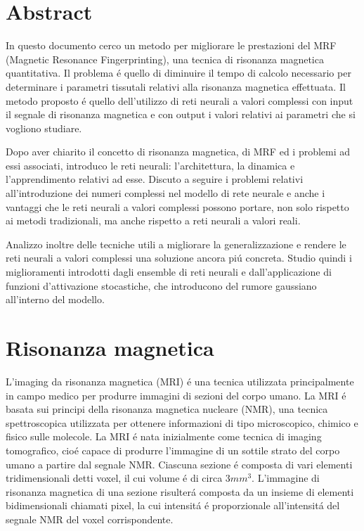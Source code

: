 \documentclass[a4paper,12pt]{report}
\begin{document}
 \chapter*{Abstract}
 
 In questo documento cerco un metodo per migliorare le prestazioni del MRF (Magnetic Resonance Fingerprinting), una tecnica di risonanza magnetica quantitativa. 
 Il problema \'e quello di diminuire il tempo di calcolo necessario per determinare i parametri tissutali relativi alla risonanza magnetica effettuata. 
 Il metodo proposto \'e quello dell'utilizzo di reti neurali a valori complessi con input il segnale di risonanza magnetica e con output i valori relativi ai parametri che si vogliono studiare. 
 
 Dopo aver chiarito il concetto di risonanza magnetica, di MRF ed i problemi ad essi associati, introduco le reti neurali: l'architettura, la dinamica e l'apprendimento relativi ad esse. 
 Discuto a seguire i problemi relativi all'introduzione dei numeri complessi nel modello di rete neurale e anche i vantaggi che le reti neurali a valori complessi possono portare, non solo rispetto ai metodi tradizionali, ma anche rispetto a reti neurali a valori reali.
 
 Analizzo inoltre delle tecniche utili a migliorare la generalizzazione e rendere le reti neurali a valori complessi una soluzione ancora pi\'u concreta. 
 Studio quindi i miglioramenti introdotti dagli ensemble di reti neurali e dall'applicazione di funzioni d'attivazione stocastiche, che introducono del rumore gaussiano all'interno del modello.
 
 \chapter{Risonanza magnetica}
 
 L'imaging da risonanza magnetica (MRI) \'e una tecnica utilizzata principalmente in campo medico per produrre immagini di sezioni del corpo umano.
 La MRI \'e basata sui principi della risonanza magnetica nucleare (NMR), una tecnica spettroscopica utilizzata per ottenere informazioni di tipo microscopico, chimico e fisico sulle molecole.
 La MRI \'e nata inizialmente come tecnica di imaging tomografico, cio\'e capace di produrre l'immagine di un sottile strato del corpo umano a partire dal segnale NMR.
 Ciascuna sezione \'e composta di vari elementi tridimensionali detti voxel, il cui volume \'e di circa $3mm^3$. 
 L'immagine di risonanza magnetica di una sezione risulter\'a composta da un insieme di elementi bidimensionali chiamati pixel, la cui intensit\'a \'e proporzionale all'intensit\'a del segnale NMR del voxel corrispondente.
 
\end{document}
